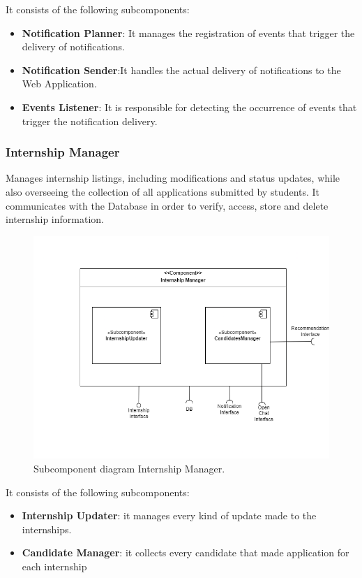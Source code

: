 It consists of the following subcomponents:
\begin{itemize}
    \item  \textbf{Notification Planner}: It manages the registration of events that trigger the delivery of notifications.
    \item  \textbf{Notification Sender}:It handles the actual delivery of notifications to the Web Application.
    \item  \textbf{Events Listener}: It is responsible for detecting the occurrence of events that trigger the notification delivery.
    \end{itemize}
 \clearpage %
\subsubsection{Internship Manager} Manages internship listings, including modifications and status updates, while also overseeing the collection of all applications submitted by students.  It communicates with the Database in order to verify, access, store and delete internship information.
    \begin{figure}[H]
    \centering
    \includegraphics[width=\linewidth]{DD/Images/Comp&Sub/InternshipManager.png}
    \caption{Subcomponent diagram Internship Manager.}
    \label{fig:internship_manager}
    \end{figure}
    
It consists of the following subcomponents:
\begin{itemize}
    \item  \textbf{Internship Updater}: it manages every kind of update made to the internships.
    \item  \textbf{Candidate Manager}: it collects every candidate that made application for each internship
    \end{itemize}

